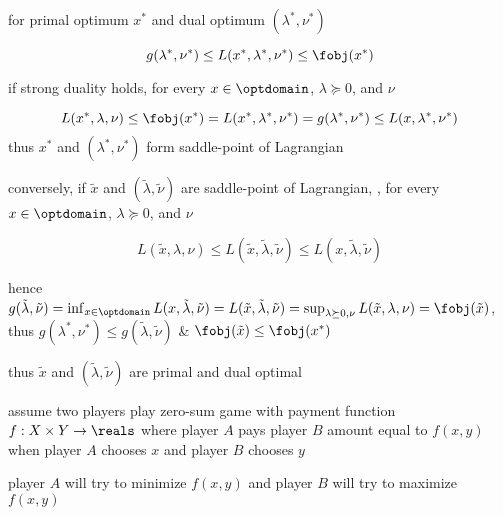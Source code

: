 \documentclass[17pt,landscape]{foils}
\begin{document}
{

\bit
\item
	for primal optimum $x^\ast$ and dual optimum $(\lambda^\ast,\nu^\ast)$

	\vspace{-1em}

	$$
		g(\lambda^\ast,\nu^\ast) \leq L(x^\ast, \lambda^\ast, \nu^\ast) \leq \fobj(x^\ast)
	$$

\vitem
	if strong duality holds,
	for every $x\in\optdomain$, $\lambda\succeq 0$, and $\nu$

	\vspace{-1em}

	$$
		L(x^\ast,\lambda,\nu)
			\leq
		\fobj(x^\ast) = L(x^\ast,\lambda^\ast,\nu^\ast) = g(\lambda^\ast,\nu^\ast)
			\leq
		L(x,\lambda^\ast, \nu^\ast)
	$$
	\bit
	\vitem
		thus $x^\ast$ and $(\lambda^\ast,\nu^\ast)$ form saddle-point of Lagrangian
	\eit

\vitem
	conversely, if $\tilde{x}$ and $(\tilde{\lambda},\tilde{\nu})$ are saddle-point of Lagrangian,
	\ie,
	for every $x\in\optdomain$, $\lambda\succeq 0$, and $\nu$

	\vspace{-1em}

	$$
		L(\tilde{x}, {\lambda},{\nu})
		\leq
		L(\tilde{x}, \tilde{\lambda},\tilde{\nu})
		\leq
		L({x}, \tilde{\lambda},\tilde{\nu})
	$$

	\bit
	\vitem
		hence
		$
			g(\tilde{\lambda},\tilde{\nu})
			= \inf_{x\in\optdomain} L(x,\tilde{\lambda},\tilde{\nu})
			= L(\tilde{x}, \tilde{\lambda},\tilde{\nu})
			= \sup_{\lambda\succeq 0, \nu} L(\tilde{x},{\lambda},{\nu}) = \fobj(\tilde{x})
		$,
		thus
		$g(\lambda^\ast,\nu^\ast) \leq g(\tilde{\lambda}, \tilde{\nu})$
		\&
		$\fobj(\tilde{x}) \leq \fobj(x^\ast)$

	\vitem
		thus $\tilde{x}$ and $(\tilde{\lambda}, \tilde{\nu})$ are primal and dual optimal
	\eit
\eit



\bit
\item
	assume
	two players play zero-sum game with payment function $f:X\times Y\to \reals$
	where
	player $A$ pays player $B$ amount equal to $f(x,y)$
	when player $A$ chooses $x$ and player $B$ chooses $y$

\vitem
	player $A$ will try to minimize $f(x,y)$
	and
	player $B$ will try to maximize $f(x,y)$

}
\end{document}
